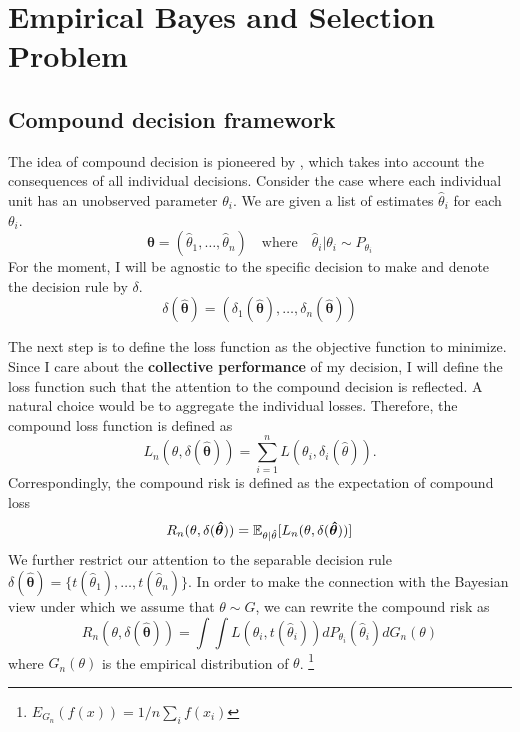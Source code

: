 \documentclass[12pt]{article}
\begin{document}
\begin{table}
    \label{tab:reg_wg_fd_iv}
    
\end{table}

\section{Empirical Bayes and Selection Problem}

\subsection{Compound decision framework}

The idea of compound decision is pioneered by \citet{robbins1956empirical},
which takes into account the consequences of all individual decisions. Consider
the case where each individual unit has an unobserved parameter $\theta_i$. We
are given a list of estimates $\hat{\theta}_i$ for each $\theta_i$.
\begin{equation*}
    \boldsymbol{\hat{\theta}}  =  (\hat{\theta}_1,\ldots, \hat{\theta}_n)\quad
    \text{where} \quad        \hat{\theta}_i | \theta_i \sim P_{\theta_i}
\end{equation*}
For the moment, I will be agnostic to the specific decision to make and denote the decision rule by $\delta$.
\begin{equation*}
    \delta(\boldsymbol{\hat{\theta}}) = (\delta_1(\boldsymbol{\hat{\theta}}), \ldots, \delta_n(\boldsymbol{\hat{\theta}}))
\end{equation*}

The next step is to define the loss function as the objective function to
minimize. Since I care about the \textbf{collective performance} of my
decision, I will define the loss function such that the attention to the
compound decision is reflected. A natural choice would be to aggregate the
individual losses. Therefore, the compound loss function is defined as
\begin{equation*}
    L_n(\theta, \delta(\boldsymbol{\hat{\theta}})) = \sum_{i=1}^n L(\theta_i, \delta_i(\hat{\theta})).
\end{equation*}
Correspondingly, the compound risk is defined as the expectation of compound loss
\begin{equation*}
    R_n(\theta, \delta(\boldsymbol{\hat{\theta}})) = \mathbb{E}_{\theta|\hat{\theta}}[L_n(\theta, \delta(\boldsymbol{\hat{\theta}}))]
\end{equation*}
We further restrict our attention to the separable decision rule $\delta(\boldsymbol{\hat{\theta}})=\{t(\hat{\theta}_1), \ldots, t(\hat{\theta}_n)\}$. In order to make the connection with the Bayesian view under which we assume
that $\theta\sim G$, we can rewrite the compound risk as
\begin{equation*}
    R_n(\theta, \delta(\boldsymbol{\hat{\theta}})) = \int \int L(\theta_i, t(\hat{\theta}_i))dP_{\theta_i}(\hat{\theta}_i)dG_n(\theta)
\end{equation*}
where $G_n(\theta)$ is the empirical distribution of $\theta$. \footnote{$E_{G_n}(f(x)) = 1/n \sum_i f(x_i)$}
\end{document}
